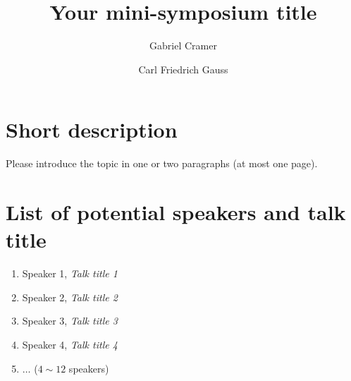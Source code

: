 \documentclass{article}
\title{Your mini-symposium title}
\author{
  Gabriel Cramer
  \and
  Carl Friedrich Gauss
}
\begin{document}
\maketitle

\section*{Short description}
Please introduce the topic in one or two paragraphs (at most one page).

\section*{List of potential speakers and talk title}
\begin{enumerate}
\item Speaker 1, \emph{Talk title 1}
\item Speaker 2, \emph{Talk title 2}
\item Speaker 3, \emph{Talk title 3}
\item Speaker 4, \emph{Talk title 4}
\item $\ldots$ ($4 \sim 12$ speakers)
\end{enumerate}
\end{document}
